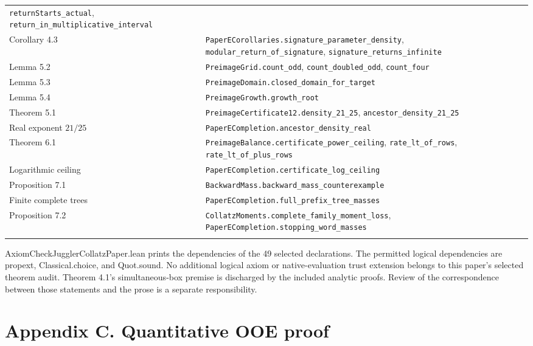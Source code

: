 \documentclass[11pt,a4paper]{article}
\begin{document}
\begin{longtable}[]{@{}
  >{\raggedright\arraybackslash}p{}
  >{\raggedright\arraybackslash}p{}@{}}
\texttt{\nolinkurl{returnStarts_actual}},
\texttt{\nolinkurl{return_in_multiplicative_interval}} \\
Corollary 4.3 &
\texttt{\nolinkurl{PaperECorollaries.signature_parameter_density}},
\texttt{\nolinkurl{modular_return_of_signature}},
\texttt{\nolinkurl{signature_returns_infinite}} \\
Lemma 5.2 & \texttt{\nolinkurl{PreimageGrid.count_odd}},
\texttt{\nolinkurl{count_doubled_odd}},
\texttt{\nolinkurl{count_four}} \\
Lemma 5.3 &
\texttt{\nolinkurl{PreimageDomain.closed_domain_for_target}} \\
Lemma 5.4 & \texttt{\nolinkurl{PreimageGrowth.growth_root}} \\
Theorem 5.1 & \texttt{\nolinkurl{PreimageCertificate12.density_21_25}},
\texttt{\nolinkurl{ancestor_density_21_25}} \\
Real exponent \(21/25\) &
\texttt{\nolinkurl{PaperECompletion.ancestor_density_real}} \\
Theorem 6.1 &
\texttt{\nolinkurl{PreimageBalance.certificate_power_ceiling}},
\texttt{\nolinkurl{rate_lt_of_rows}},
\texttt{\nolinkurl{rate_lt_of_plus_rows}} \\
Logarithmic ceiling &
\texttt{\nolinkurl{PaperECompletion.certificate_log_ceiling}} \\
Proposition 7.1 &
\texttt{\nolinkurl{BackwardMass.backward_mass_counterexample}} \\
Finite complete trees &
\texttt{\nolinkurl{PaperECompletion.full_prefix_tree_masses}} \\
Proposition 7.2 &
\texttt{\nolinkurl{CollatzMoments.complete_family_moment_loss}},
\texttt{\nolinkurl{PaperECompletion.stopping_word_masses}} \\*
\end{longtable}

\endgroup

AxiomCheckJugglerCollatzPaper.lean prints the dependencies of the 49
selected declarations. The permitted logical dependencies are propext,
Classical.choice, and Quot.sound. No additional logical axiom or
native-evaluation trust extension belongs to this paper's selected
theorem audit. Theorem 4.1's simultaneous-box premise is discharged by
the included analytic proofs. Review of the correspondence between those
statements and the prose is a separate responsibility.

\section{Appendix C. Quantitative OOE
proof}\label{appendix-c.-quantitative-ooe-proof}
\end{document}
